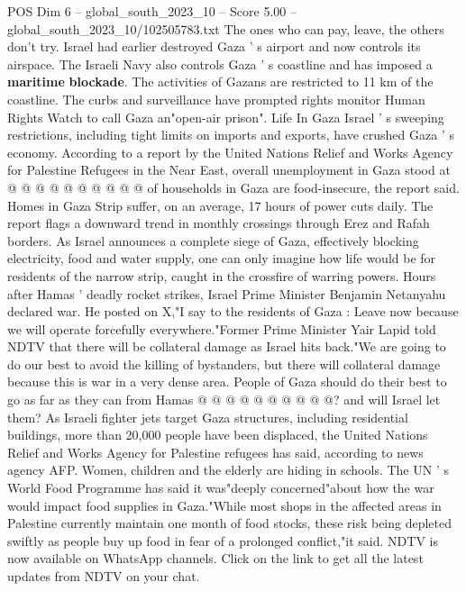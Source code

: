 \begin{textsample}{POS Dim 6 – global\_south\_2023\_10 – Score 5.00 – global\_south\_2023\_10/102505783.txt}
The ones who can pay, leave, the others don't try.
Israel had earlier destroyed Gaza ' s airport and now controls its airspace.
The Israeli Navy also controls Gaza ' s coastline and has imposed a \textbf{maritime} \textbf{blockade}.
The activities of Gazans are restricted to 11 km of the coastline.
The curbs and surveillance have prompted rights monitor Human Rights Watch to call Gaza an"open-air prison".
Life In Gaza Israel ' s sweeping restrictions, including tight limits on imports and exports, have crushed Gaza ' s economy.
According to a report by the United Nations Relief and Works Agency for Palestine Refugees in the Near East, overall unemployment in Gaza stood at @ @ @ @ @ @ @ @ @ @ of households in Gaza are food-insecure, the report said.
Homes in Gaza Strip suffer, on an average, 17 hours of power cuts daily.
The report flags a downward trend in monthly crossings through Erez and Rafah borders.
As Israel announces a complete siege of Gaza, effectively blocking electricity, food and water supply, one can only imagine how life would be for residents of the narrow strip, caught in the crossfire of warring powers.
Hours after Hamas ' deadly rocket strikes, Israel Prime Minister Benjamin Netanyahu declared war.
He posted on X,"I say to the residents of Gaza : Leave now because we will operate forcefully everywhere."Former Prime Minister Yair Lapid told NDTV that there will be collateral damage as Israel hits back."We are going to do our best to avoid the killing of bystanders, but there will collateral damage because this is war in a very dense area.
People of Gaza should do their best to go as far as they can from Hamas @ @ @ @ @ @ @ @ @ @? and will Israel let them?
As Israeli fighter jets target Gaza structures, including residential buildings, more than 20,000 people have been displaced, the United Nations Relief and Works Agency for Palestine refugees has said, according to news agency AFP.
Women, children and the elderly are hiding in schools.
The UN ' s World Food Programme has said it was"deeply concerned"about how the war would impact food supplies in Gaza."While most shops in the affected areas in Palestine currently maintain one month of food stocks, these risk being depleted swiftly as people buy up food in fear of a prolonged conflict,"it said.
NDTV is now available on WhatsApp channels.
Click on the link to get all the latest updates from NDTV on your chat.

\end{textsample}
